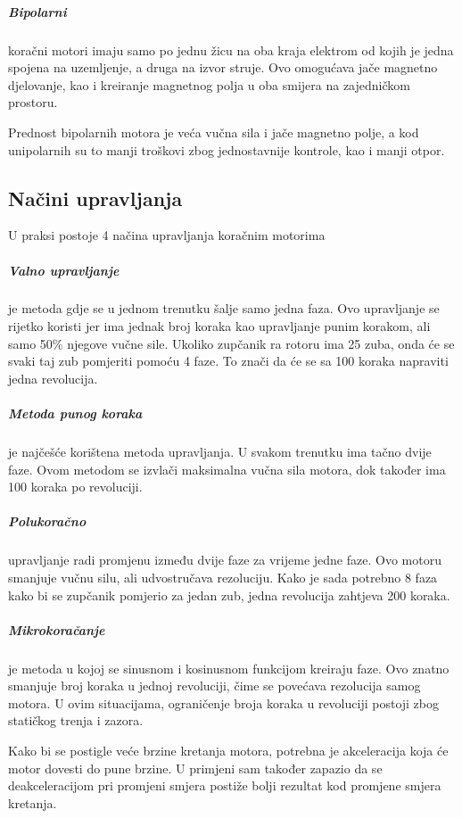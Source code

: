 \documentclass[../Document.tex]{subfiles}
\begin{document}

\subparagraph{Bipolarni} \noindent koračni motori imaju samo po jednu žicu na oba kraja elektrom od kojih je jedna spojena na uzemljenje, a druga na izvor struje. Ovo omogućava jače magnetno djelovanje, kao i kreiranje magnetnog polja u oba smijera na zajedničkom prostoru.\\


\noindent Prednost bipolarnih motora je veća vučna sila i jače magnetno polje, a kod unipolarnih su to manji troškovi zbog jednostavnije kontrole, kao i manji otpor.

\subsection{Načini upravljanja}
U praksi postoje 4 načina upravljanja koračnim motorima

\subparagraph{Valno upravljanje} je metoda gdje se u jednom trenutku šalje samo jedna faza. Ovo upravljanje se rijetko koristi jer ima jednak broj koraka kao upravljanje punim korakom, ali samo 50\% njegove vučne sile. Ukoliko zupčanik ra rotoru ima 25 zuba, onda će se svaki taj zub pomjeriti pomoću 4 faze. To znači da će se sa 100 koraka napraviti jedna revolucija.\\

\subparagraph{Metoda punog koraka} je najčešće korištena metoda upravljanja. U svakom trenutku ima tačno dvije faze. Ovom metodom se izvlači maksimalna vučna sila motora, dok također ima 100 koraka po revoluciji.\\


\subparagraph{Polukoračno} upravljanje radi promjenu između dvije faze za vrijeme jedne faze. Ovo motoru smanjuje vučnu silu, ali udvostručava rezoluciju. Kako je sada potrebno 8 faza kako bi se zupčanik pomjerio za jedan zub, jedna  revolucija zahtjeva 200 koraka.\\


\subparagraph{Mikrokoračanje} je metoda u kojoj se sinusnom i kosinusnom funkcijom kreiraju faze. Ovo znatno smanjuje broj koraka u jednoj revoluciji, čime se povećava rezolucija samog motora. U ovim situacijama, ograničenje broja koraka u revoluciji postoji zbog statičkog trenja i zazora.\\

\noindent Kako bi se postigle veće brzine kretanja motora, potrebna je akceleracija koja će motor dovesti do pune brzine. U primjeni sam također zapazio da se deakceleracijom pri promjeni smjera postiže bolji rezultat kod promjene smjera kretanja.
\end{document}

